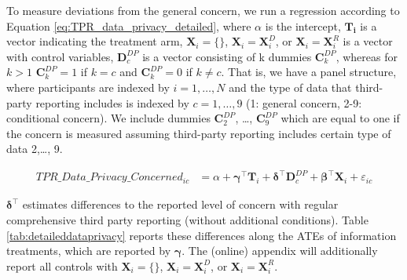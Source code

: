 \documentclass[11pt]{article}
\begin{document}
To measure deviations from the general concern, we run a regression according to Equation \ref{eq:TPR_data_privacy_detailed}, where $\alpha$ is the intercept, $\mathbf{T_i}$ is a vector indicating the treatment arm, $\mathbf{X}_{i} = \{\}$, $\mathbf{X}_{i} = \mathbf{X}_{i}^{D}$, or  $\mathbf{X}_{i} = \mathbf{X}_{i}^{R}$ is a vector with control variables, $\mathbf{D}_c^{DP}$ is a vector consisting of k dummies $\mathbf{C}_k^{DP}$, whereas for $k>1$ $\mathbf{C}_k^{DP}=1$ if $k=c$ and $\mathbf{C}_k^{DP}=0$ if $k \neq c$. That is, we have a panel structure, where participants are indexed by $i=1,\ldots,N$ and the type of data that third-party reporting includes is indexed by $c=1,\ldots,9$ (1: general concern, 2-9: conditional concern). We include dummies $\mathbf{C}_2^{DP}$, \ldots, $\mathbf{C}_9^{DP}$ which are equal to one if the concern is measured assuming third-party reporting includes certain type of data 2,\ldots, 9. 
\begin{center}
\begin{align}
    \label{eq:TPR_data_privacy_detailed}
    \text{$TPR\_Data\_Privacy\_Concerned_{ic}$}
    &= \alpha + \boldsymbol{\gamma}^{\top}\mathbf{T}_i + \boldsymbol{\delta}^{\top}\mathbf{D}_c^{DP}+ \boldsymbol{\beta}^{\top}\mathbf{X}_{i} + \varepsilon_{ic}
\end{align}
\end{center}

$\boldsymbol{\delta}^{\top}$ estimates differences to the reported level of concern with regular comprehensive third party reporting (without additional conditions). Table \ref{tab:detaileddataprivacy} reports these differences along the ATEs of information treatments, which are reported by $\boldsymbol{\gamma}$. The (online) appendix will additionally report all controls with $\mathbf{X}_{i} = \{\}$, $\mathbf{X}_{i} = \mathbf{X}_{i}^{D}$, or  $\mathbf{X}_{i} = \mathbf{X}_{i}^{R}$.
\end{document}
